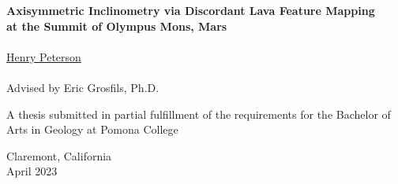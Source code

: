 \begin{titlepage}
    \begin{center}

        \phantom{.}

        \vfill
 
        \large\textbf{Axisymmetric Inclinometry via Discordant Lava Feature Mapping \\ at the Summit of Olympus Mons, Mars}
        \\~\\
        \href{mailto:hgpa2018@mymail.pomona.edu}{Henry Peterson}
        \\~\\
        Advised by Eric Grosfils, Ph.D.

        \vfill
        \vfill
        \vfill

        A thesis submitted in partial fulfillment of the requirements for the Bachelor of Arts in Geology at Pomona College

        \vfill
        \vfill
        \vfill

        Claremont, California\\
        April 2023

    \end{center}
 \end{titlepage}